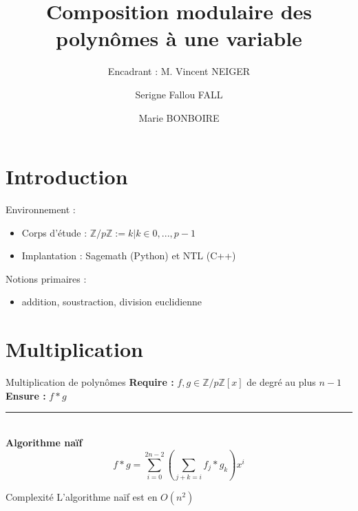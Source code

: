 \documentclass[10pt,a4paper]{beamer}
\institute{Sorbonne Université}
\title[Center text]{\textbf{Composition modulaire des polynômes à une variable}}
\subtitle{\small{Encadrant : M. Vincent NEIGER}}
\author{Serigne Fallou FALL \and Marie BONBOIRE}
\date{}
\begin{document}
\begin{frame}[plain]
    \titlepage
\end{frame}

\begin{frame}
    \tableofcontents
\end{frame}

\section{Introduction}
\begin{frame}
    \tableofcontents[currentsection]
\end{frame}

\begin{frame}
    Environnement :
    \begin{itemize}
        \item Corps d'étude : $\mathbb{Z}/p\mathbb{Z} := {k | k\in{0, ..., p-1}}$
        \item Implantation : Sagemath (Python) et NTL (C++)  
    \end{itemize}

    Notions primaires :
    \begin{itemize}
        \item addition, soustraction, division euclidienne
    \end{itemize}
\end{frame}

\section{Multiplication}
\begin{frame}
    \tableofcontents[currentsection]
\end{frame}

\begin{frame}
    \begin{block}{Multiplication de polynômes}
        \textbf{Require :} $f,g \in \mathbb{Z}/p\mathbb{Z}[x]$ de degré au plus $n-1$ \\
        \textbf{Ensure :} $f*g$
    \end{block}
    \rule{\linewidth}{0.2mm}\\[0.5cm]
    \textbf{Algorithme naïf}
    \[
    f*g=\sum_{i=0}^{2n-2} (\sum_{j+k=i}f_j*g_k) x^i
    \]

    \begin{alertblock}{Complexité}
        L'algorithme naïf est en $O(n^2)$
    \end{alertblock}

\end{frame}
\end{document}
